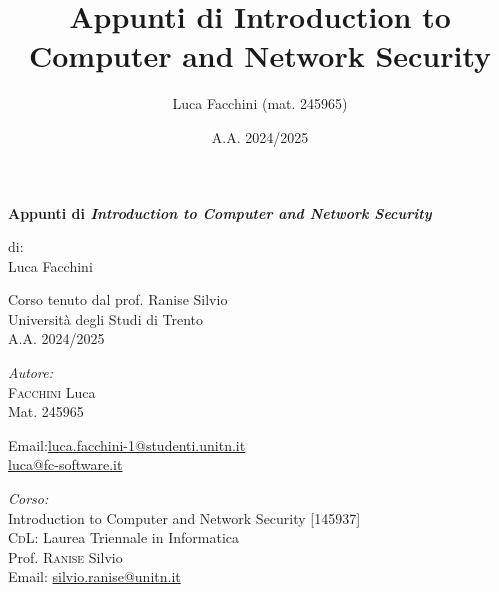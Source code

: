 \documentclass[twoside,a4paper]{report}
\title{Appunti di Introduction to Computer and Network Security}
\author{Luca Facchini (mat. 245965)}
\date{A.A. 2024/2025}
\begin{document}
    
    \begin{titlepage}
        \centering  %
        {\Huge\textbf{Appunti di \textit{Introduction to Computer and Network Security}}} \\[1cm] %
        \vspace{1.5cm}
        
        {\normalsize di: } \\[.3cm]
        {\Large Luca Facchini} \\ %
        \vspace{1.5cm}
        
        {\large Corso tenuto dal prof. Ranise Silvio} \\[0.3cm] %
        {\large Università degli Studi di Trento} \\[1.5cm]
        
        {\large A.A. 2024/2025} \\[3cm] %
        
        \vfill

        \begin{minipage}[t]{0.4\textwidth}
            \begin{flushleft} \normalsize
                \emph{Autore:}\\
                \textsc{Facchini} Luca \\ %
                Mat. 245965 \\
                \vspace{-\baselineskip}
                \begin{tabbing}
                    Email:\= \href{mailto:luca.facchini-1@studenti.unitn.it}{luca.facchini-1@studenti.unitn.it} \\
                        \>  \href{mailto:luca@fc-software.it}{luca@fc-software.it}
                \end{tabbing}
            \end{flushleft}
        \end{minipage}
        \hfill
        \begin{minipage}[t]{0.4\textwidth}
            \begin{flushleft} \normalsize
                \emph{Corso:}\\
                Introduction to Computer and Network Security [145937] \\
                \textsc{CdL}: Laurea Triennale in Informatica \\
                Prof. \textsc{Ranise} Silvio \\
                Email: \href{mailto:silvio.ranise@unitn.it}{silvio.ranise@unitn.it}
            \end{flushleft}
        \end{minipage}


\end{titlepage}
\end{document}
